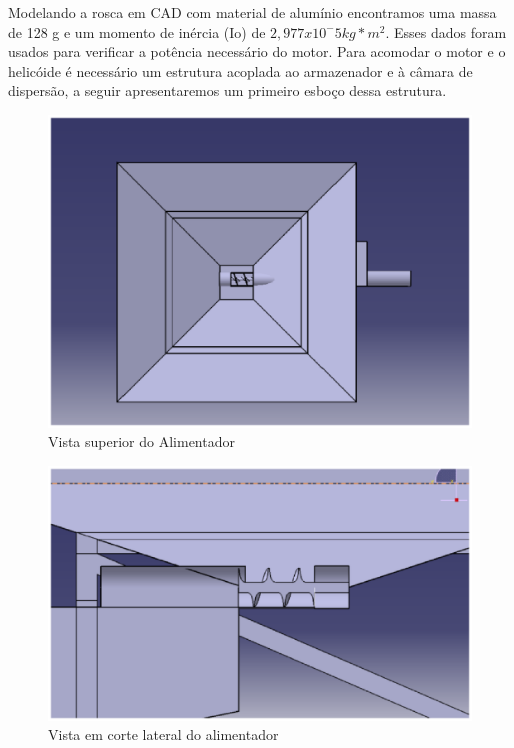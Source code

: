 Modelando a rosca em CAD com material de alumínio encontramos uma massa de 128 g e um momento de inércia  (Io) de $2,977x10^-5 kg*m^2$. Esses dados foram usados para verificar a potência necessário do motor. Para acomodar o motor e o helicóide é necessário um estrutura acoplada ao armazenador e à câmara de dispersão, a seguir apresentaremos um primeiro esboço dessa estrutura.

\begin{figure}[H]
 \centering
   \includegraphics[keepaspectratio=true,scale=0.8]{figuras/vista_superior.eps}
 \caption{Vista superior do Alimentador}
 \label{vista_superior}
\end{figure}

\begin{figure}[H]
 \centering
   \includegraphics[keepaspectratio=true,scale=0.8]{figuras/corte_lateral.eps}
 \caption{Vista em corte lateral do alimentador}
 \label{corte_lateral}
\end{figure}

